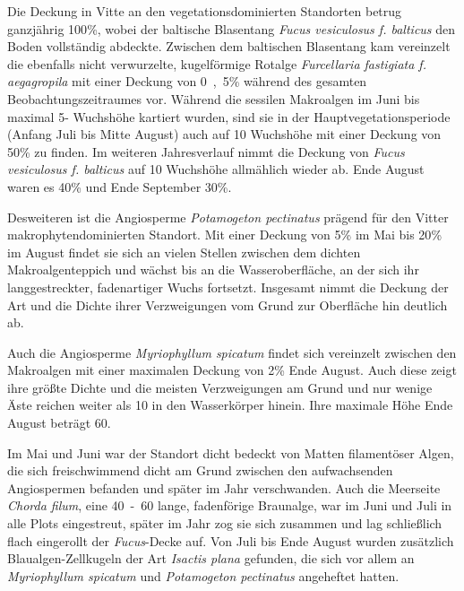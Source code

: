 Die Deckung in Vitte an den vegetationsdominierten Standorten betrug ganzjährig \unit{100}{\%}, wobei der baltische Blasentang \textit{Fucus vesiculosus f. balticus} den Boden vollständig abdeckte. Zwischen dem baltischen Blasentang kam vereinzelt die ebenfalls nicht verwurzelte, kugelförmige Rotalge \textit{Furcellaria fastigiata f. aegagropila} mit einer Deckung von \unit{0,5}{\%} während des gesamten Beobachtungszeitraumes vor. Während die sessilen Makroalgen im Juni bis maximal \unit{5}{\centi\metre}- Wuchshöhe kartiert wurden, sind sie in der Hauptvegetationsperiode (Anfang Juli bis Mitte August) auch auf \unit{10}{\centi\metre} Wuchshöhe mit einer Deckung von \unit{50}{\%} zu finden. Im weiteren Jahresverlauf nimmt die Deckung von \textit{Fucus vesiculosus f. balticus} auf \unit{10}{\centi\metre} Wuchshöhe allmählich wieder ab. Ende August waren es \unit{40}{\%} und Ende September \unit{30}{\%}.

Desweiteren ist die Angiosperme \textit{Potamogeton pectinatus} prägend für den Vitter makrophytendominierten Standort. Mit einer Deckung von \unit{5}{\%} im Mai bis \unit{20}{\%} im August findet sie sich an vielen Stellen zwischen dem dichten Makroalgenteppich und wächst bis an die Wasseroberfläche, an der sich ihr langgestreckter, fadenartiger Wuchs fortsetzt. Insgesamt nimmt die Deckung der Art und die Dichte ihrer Verzweigungen vom Grund zur Oberfläche hin deutlich ab. 

Auch die Angiosperme \textit{Myriophyllum spicatum} findet sich vereinzelt zwischen den Makroalgen mit einer maximalen Deckung von \unit{2}{\%} Ende August. Auch diese zeigt ihre größte Dichte und die meisten Verzweigungen am Grund und nur wenige Äste reichen weiter als \unit{10}{\centi\metre} in den Wasserkörper hinein. Ihre maximale Höhe Ende August beträgt \unit{60}{\centi\metre}.

Im Mai und Juni war der Standort dicht bedeckt von Matten filamentöser Algen, die sich freischwimmend dicht am Grund zwischen den aufwachsenden Angiospermen befanden und später im Jahr verschwanden. Auch die Meerseite \textit{Chorda filum}, eine \unit{40-60}{\centi\metre} lange, fadenförige Braunalge, war im Juni und Juli in alle Plots eingestreut, später im Jahr zog sie sich zusammen und lag schließlich flach eingerollt der \textit{Fucus}-Decke auf. Von Juli bis Ende August wurden zusätzlich Blaualgen-Zellkugeln der Art \textit{Isactis plana} gefunden, die sich vor allem an \textit{Myriophyllum spicatum} und \textit{Potamogeton pectinatus} angeheftet hatten.



